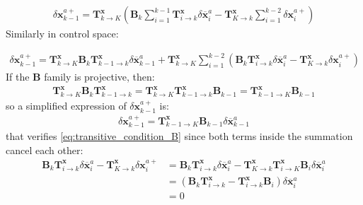 \documentclass[npg, manuscript]{copernicus}
\begin{document}
\begin{align}
\label{eq:transitive_condition_B}
\boxed{\delta \mathbf{x}^{a+}_{k-1} = \mathbf{T}^\mathbf{x}_{k \rightarrow K} \left(\mathbf{B}_k \sum_{i=1}^{k-1} \mathbf{T}^\mathbf{x}_{i \rightarrow k} \delta \overline{\mathbf{x}}^a_i - \mathbf{T}^\mathbf{x}_{K \rightarrow k} \sum_{i=1}^{k-2} \delta \mathbf{x}^{a+}_i\right)}
\end{align}
Similarly in control space:

\begin{align}
\delta \mathbf{x}^{a+}_{k-1} = \mathbf{T}^\mathbf{x}_{k \rightarrow K} \mathbf{B}_k \mathbf{T}^\mathbf{x}_{k-1 \rightarrow k} \delta \overline{\mathbf{x}}^a_{k-1} + \mathbf{T}^\mathbf{x}_{k \rightarrow K} \sum_{i=1}^{k-2} \left(\mathbf{B}_k \mathbf{T}^\mathbf{x}_{i \rightarrow k} \delta \overline{\mathbf{x}}^a_i - \mathbf{T}^\mathbf{x}_{K \rightarrow k} \delta \mathbf{x}^{a+}_i\right)
\end{align}
If the $\mathbf{B}$ family is projective, then:
\begin{align}
\mathbf{T}^\mathbf{x}_{k \rightarrow K} \mathbf{B}_k \mathbf{T}^\mathbf{x}_{k-1 \rightarrow k} = \mathbf{T}^\mathbf{x}_{k \rightarrow K} \mathbf{T}^\mathbf{x}_{k-1 \rightarrow k} \mathbf{B}_{k-1} = \mathbf{T}^\mathbf{x}_{k-1 \rightarrow K} \mathbf{B}_{k-1}
\end{align}
so a simplified expression of $\delta \mathbf{x}^{a+}_{k-1}$ is:
\begin{align}
\label{eq:projective_condition_B}
\boxed{\delta \mathbf{x}^{a+}_{k-1} = \mathbf{T}^\mathbf{x}_{k-1 \rightarrow K} \mathbf{B}_{k-1} \delta \overline{\mathbf{x}}^a_{k-1}}
\end{align}
that verifies \eqref{eq:transitive_condition_B} since both terms inside the summation cancel each other:
\begin{align}
\mathbf{B}_k \mathbf{T}^\mathbf{x}_{i \rightarrow k} \delta \overline{\mathbf{x}}^a_i - \mathbf{T}^\mathbf{x}_{K \rightarrow k} \delta \mathbf{x}^{a+}_i & = \mathbf{B}_k \mathbf{T}^\mathbf{x}_{i \rightarrow k} \delta \overline{\mathbf{x}}^a_i - \mathbf{T}^\mathbf{x}_{K \rightarrow k}  \mathbf{T}^\mathbf{x}_{i \rightarrow K} \mathbf{B}_i \delta \overline{\mathbf{x}}^a_i \nonumber \\
& = \left(\mathbf{B}_k \mathbf{T}^\mathbf{x}_{i \rightarrow k} - \mathbf{T}^\mathbf{x}_{i \rightarrow k} \mathbf{B}_i \right) \delta \overline{\mathbf{x}}^a_i \nonumber \\
& = 0
\end{align}
\end{document}
